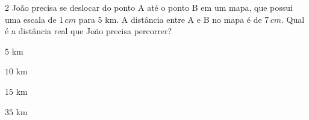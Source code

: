 

\num{2}  João precisa se deslocar do ponto A até o ponto B em um mapa, que
possui uma escala de $1\,cm$ para $5$ km. A distância entre A e B no mapa é
de $7\,cm$. Qual é a distância real que João precisa percorrer?

\begin{escolha}
\item $5$ km
\item $10$ km
\item $15$ km
\item $35$ km
\end{escolha}



